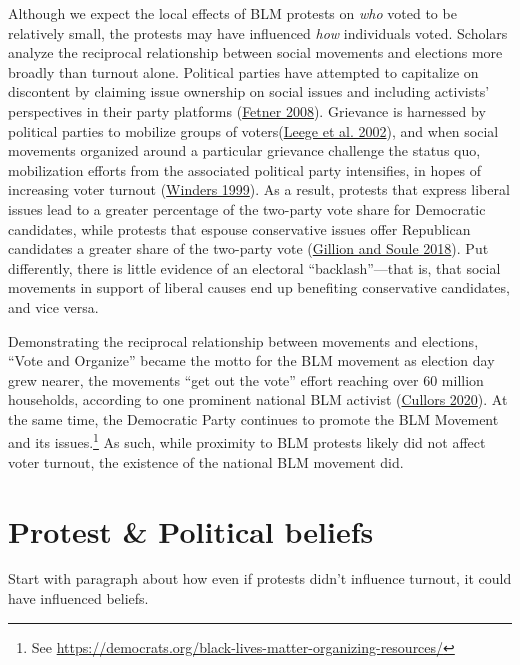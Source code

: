 \documentclass[
  12pt,
]{article}
\begin{document}
Although we expect the local effects of BLM protests on \emph{who} voted to be relatively small, the protests may have influenced \emph{how} individuals voted. Scholars analyze the reciprocal relationship between social movements and elections more broadly than turnout alone. Political parties have attempted to capitalize on discontent by claiming issue ownership on social issues and including activists' perspectives in their party platforms (\protect\hyperlink{ref-Fetner2008}{Fetner 2008}). Grievance is harnessed by political parties to mobilize groups of voters(\protect\hyperlink{ref-Leege2002}{Leege et al. 2002}), and when social movements organized around a particular grievance challenge the status quo, mobilization efforts from the associated political party intensifies, in hopes of increasing voter turnout (\protect\hyperlink{ref-Winders1999}{Winders 1999}). As a result, protests that express liberal issues lead to a greater percentage of the two-party vote share for Democratic candidates, while protests that espouse conservative issues offer Republican candidates a greater share of the two-party vote (\protect\hyperlink{ref-Gillion2018}{Gillion and Soule 2018}). Put differently, there is little evidence of an electoral ``backlash''---that is, that social movements in support of liberal causes end up benefiting conservative candidates, and vice versa.

Demonstrating the reciprocal relationship between movements and elections, ``Vote and Organize'' became the motto for the BLM movement as election day grew nearer, the movements ``get out the vote'' effort reaching over 60 million households, according to one prominent national BLM activist (\protect\hyperlink{ref-Cullors2020}{Cullors 2020}). At the same time, the Democratic Party continues to promote the BLM Movement and its issues.\footnote{See \url{https://democrats.org/black-lives-matter-organizing-resources/}} As such, while proximity to BLM protests likely did not affect voter turnout, the existence of the national BLM movement did.

\hypertarget{protest-political-beliefs}{%
\section*{Protest \& Political beliefs}\label{protest-political-beliefs}}

Start with paragraph about how even if protests didn't influence turnout, it could have influenced beliefs.
\end{document}
